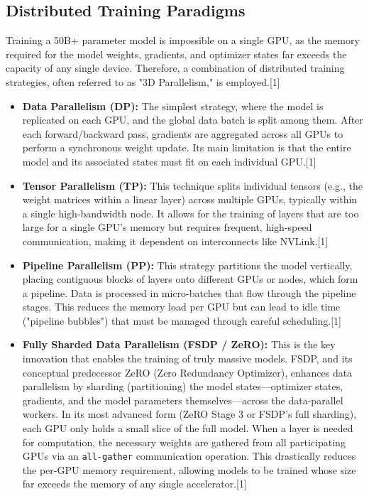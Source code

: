 \documentclass[12pt, a4paper]{article}
\begin{document}
\subsection{Distributed Training Paradigms}

Training a 50B+ parameter model is impossible on a single GPU, as the memory required for the model weights, gradients, and optimizer states far exceeds the capacity of any single device. Therefore, a combination of distributed training strategies, often referred to as "3D Parallelism," is employed.[1]

\begin{itemize}
    \item \textbf{Data Parallelism (DP):} The simplest strategy, where the model is replicated on each GPU, and the global data batch is split among them. After each forward/backward pass, gradients are aggregated across all GPUs to perform a synchronous weight update. Its main limitation is that the entire model and its associated states must fit on each individual GPU.[1]
    \item \textbf{Tensor Parallelism (TP):} This technique splits individual tensors (e.g., the weight matrices within a linear layer) across multiple GPUs, typically within a single high-bandwidth node. It allows for the training of layers that are too large for a single GPU's memory but requires frequent, high-speed communication, making it dependent on interconnects like NVLink.[1]
    \item \textbf{Pipeline Parallelism (PP):} This strategy partitions the model vertically, placing contiguous blocks of layers onto different GPUs or nodes, which form a pipeline. Data is processed in micro-batches that flow through the pipeline stages. This reduces the memory load per GPU but can lead to idle time ("pipeline bubbles") that must be managed through careful scheduling.[1]
    \item \textbf{Fully Sharded Data Parallelism (FSDP / ZeRO):} This is the key innovation that enables the training of truly massive models. FSDP, and its conceptual predecessor ZeRO (Zero Redundancy Optimizer), enhances data parallelism by sharding (partitioning) the model states—optimizer states, gradients, and the model parameters themselves—across the data-parallel workers. In its most advanced form (ZeRO Stage 3 or FSDP's full sharding), each GPU only holds a small slice of the full model. When a layer is needed for computation, the necessary weights are gathered from all participating GPUs via an \texttt{all-gather} communication operation. This drastically reduces the per-GPU memory requirement, allowing models to be trained whose size far exceeds the memory of any single accelerator.[1]
\end{itemize}
\end{document}
